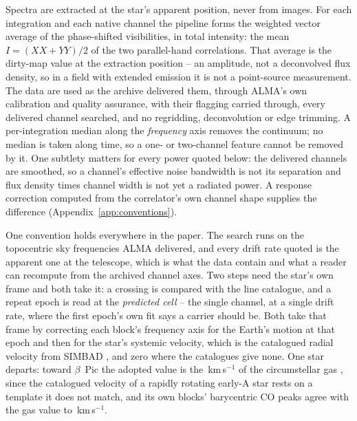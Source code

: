 Spectra are extracted at the star's apparent position, never from images.
For each integration and each native channel the pipeline forms the weighted
vector average of the phase-shifted visibilities, in total intensity: the
mean $I=(XX+YY)/2$ of the two parallel-hand correlations. That average is the
dirty-map value at the extraction position -- an amplitude, not a
deconvolved flux density, so in a field with extended emission it is not a
point-source measurement. The data are used as the archive delivered them,
through ALMA's own calibration and quality assurance, with their flagging
carried through, every delivered channel searched, and no regridding,
deconvolution or edge trimming. A per-integration median along the
\emph{frequency} axis removes the continuum; no median is taken along
time, so a one- or two-channel feature cannot be removed by it. One
subtlety matters for every power quoted below: the delivered channels are
smoothed, so a channel's effective noise bandwidth is not its separation
and flux density times channel width is not yet a radiated power. A
response correction computed from the correlator's own channel shape
supplies the difference (Appendix~\ref{app:conventions}).

One convention holds everywhere in the paper. The search runs on the
topocentric sky frequencies ALMA delivered, and every drift rate quoted is
the apparent one at the telescope, which is what the data contain and what
a reader can recompute from the archived channel axes. Two steps need the
star's own frame and both take it: a crossing is compared with the line catalogue, and a repeat epoch is read
at the \emph{predicted cell} -- the single channel, at a single drift rate,
where the first epoch's own fit says a carrier should be. Both take that
frame by correcting each block's frequency axis for the Earth's motion at
that epoch and then for the star's systemic velocity, which is the
catalogued radial velocity from SIMBAD \citep{SIMBAD2000}, and zero where the
catalogues give none. One star departs: toward $\beta$~Pic the adopted value
is the \BpRecVsys\,km\,s$^{-1}$ of the circumstellar gas \citep{Matra2017},
since the catalogued velocity of a rapidly rotating early-A star rests on a
template it does not match, and its own blocks' barycentric CO peaks agree
with the gas value to \BpRecVsysSpread\,km\,s$^{-1}$.

